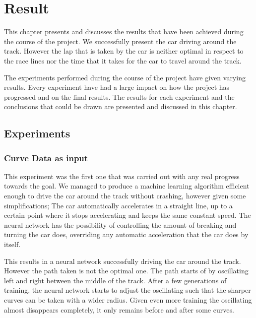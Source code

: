 \chapter{Result}
This chapter presents and discusses the results that have been achieved during the course of the project. We successfully present the car driving around the track. However the lap that is taken by the car is neither optimal in respect to the race lines nor the time that it takes for the car to travel around the track.

The experiments performed during the course of the project have given varying results. Every experiment have had a large impact on how the project has progressed and on the final results. The results for each experiment and the conclusions that could be drawn are presented and discussed in this chapter.

\section{Experiments}

\subsection{Curve Data as input}
This experiment was the first one that was carried out with any real progress towards the goal. We managed to produce a machine learning algorithm efficient enough to drive the car around the track without crashing, however given some simplifications; The car automatically accelerates in a straight line, up to a certain point where it stops accelerating and keeps the same constant speed. The neural network has the possibility of controlling the amount of breaking and turning the car does, overriding any automatic acceleration that the car does by itself.

This results in a neural network successfully driving the car around the track. However the path taken is not the optimal one. The path starts of by oscillating left and right between the middle of the track. After a few generations of training, the neural network starts to adjust the oscillating such that the sharper curves can be taken with a wider radius. Given even more training the oscillating almost disappears completely, it only remains before and after some curves.

